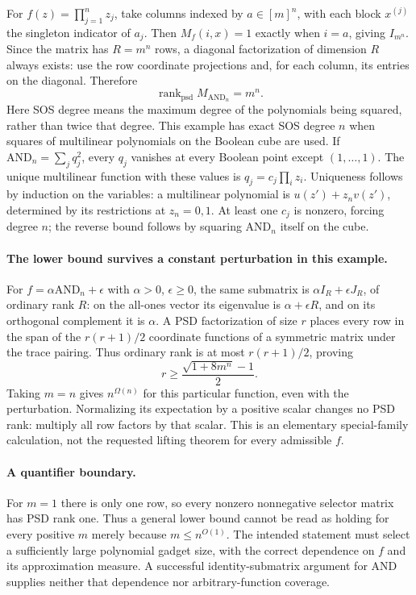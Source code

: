 \documentclass[11pt]{article}
\begin{document}
For $f(z)=\prod_{j=1}^n z_j$, take columns indexed by $a\in[m]^n$, with each block $x^{(j)}$ the singleton indicator of $a_j$. Then $M_f(i,x)=1$ exactly when $i=a$, giving $I_{m^n}$. Since the matrix has $R=m^n$ rows, a diagonal factorization of dimension $R$ always exists: use the row coordinate projections and, for each column, its entries on the diagonal. Therefore
\[
 \operatorname{rank}_{\mathrm{psd}}M_{\mathrm{AND}_n}=m^n.
\]
Here SOS degree means the maximum degree of the polynomials being squared, rather than twice that degree. This example has exact SOS degree $n$ when squares of multilinear polynomials on the Boolean cube are used. If $\mathrm{AND}_n=\sum_jq_j^2$, every $q_j$ vanishes at every Boolean point except $(1,\ldots,1)$. The unique multilinear function with these values is $q_j=c_j\prod_i z_i$. Uniqueness follows by induction on the variables: a multilinear polynomial is $u(z')+z_n v(z')$, determined by its restrictions at $z_n=0,1$. At least one $c_j$ is nonzero, forcing degree $n$; the reverse bound follows by squaring $\mathrm{AND}_n$ itself on the cube.

\paragraph{The lower bound survives a constant perturbation in this example.}
For $f=\alpha\mathrm{AND}_n+\epsilon$ with $\alpha>0$, $\epsilon\ge0$, the same submatrix is $\alpha I_R+\epsilon J_R$, of ordinary rank $R$: on the all-ones vector its eigenvalue is $\alpha+\epsilon R$, and on its orthogonal complement it is $\alpha$. A PSD factorization of size $r$ places every row in the span of the $r(r+1)/2$ coordinate functions of a symmetric matrix under the trace pairing. Thus ordinary rank is at most $r(r+1)/2$, proving
\[
 r\ge \frac{\sqrt{1+8m^n}-1}{2}.
\]
Taking $m=n$ gives $n^{\Omega(n)}$ for this particular function, even with the perturbation. Normalizing its expectation by a positive scalar changes no PSD rank: multiply all row factors by that scalar. This is an elementary special-family calculation, not the requested lifting theorem for every admissible $f$.

\paragraph{A quantifier boundary.}
For $m=1$ there is only one row, so every nonzero nonnegative selector matrix has PSD rank one. Thus a general lower bound cannot be read as holding for every positive $m$ merely because $m\le n^{O(1)}$. The intended statement must select a sufficiently large polynomial gadget size, with the correct dependence on $f$ and its approximation measure. A successful identity-submatrix argument for AND supplies neither that dependence nor arbitrary-function coverage.
\end{document}
